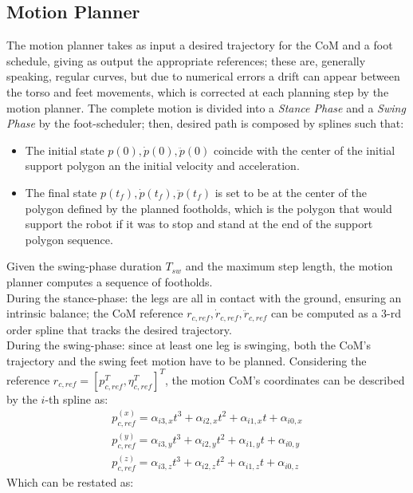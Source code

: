 \subsection{Motion Planner}
The motion planner takes as input a desired trajectory for the CoM and a foot schedule, giving as output the appropriate references; these are, generally speaking, regular curves, but due to numerical errors a drift can appear between the torso and feet movements, which is corrected at each planning step by the motion planner. The complete motion is divided into a \textit{Stance Phase} and a \textit{Swing Phase} by the foot-scheduler; then, desired path is composed by splines such that:
\begin{itemize}
    \item The initial state $p(0),\dot{p}(0),\ddot{p}(0)$ coincide with the center of the initial support polygon an the initial velocity and acceleration.
    \item The final state $p(t_f),\dot{p}(t_f),\ddot{p}(t_f)$ is set to be at the center of the polygon defined by the planned footholds, which is the polygon that would support the robot if it was to stop and stand at the end of the support polygon sequence.
\end{itemize}
Given the swing-phase duration $T_{sw}$ and the maximum step length, the motion planner computes a sequence of footholds.\\
During the stance-phase: the legs are all in contact with the ground, ensuring an intrinsic balance; the CoM reference $r_{c,ref}, \dot{r}_{c,ref}, \ddot{r}_{c,ref}$ can be computed as a 3-rd order spline that tracks the desired trajectory.\\
During the swing-phase: since at least one leg is swinging, both the CoM's trajectory and the swing feet motion have to be planned. Considering the reference $r_{c,ref}=[p_{c,ref}^{T},\eta_{c,ref}^{T}]^{T}$, the motion CoM's coordinates can be described by the $i$-th spline as:
\begin{gather*}
    p_{c,ref}^{(x)}=\alpha_{i3,x}t^{3}+\alpha_{i2,x}t^2+\alpha_{i1,x}t+\alpha_{i0,x}\\
    p_{c,ref}^{(y)}=\alpha_{i3,y}t^{3}+\alpha_{i2,y}t^2+\alpha_{i1,y}t+\alpha_{i0,y}\\
    p_{c,ref}^{(z)}=\alpha_{i3,z}t^{3}+\alpha_{i2,z}t^2+\alpha_{i1,z}t+\alpha_{i0,z}
\end{gather*}
Which can be restated as:
